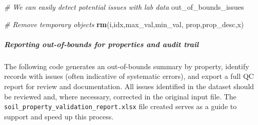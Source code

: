\documentclass[
  10pt,
  b5paper,
  oneside]{book}
\newenvironment{Shaded}{\begin{snugshade}}{\end{snugshade}}
\newcommand{\CommentTok}[1]{\textcolor[rgb]{0.56,0.35,0.01}{\textit{#1}}}
\newcommand{\FunctionTok}[1]{\textcolor[rgb]{0.13,0.29,0.53}{\textbf{#1}}}
\newcommand{\NormalTok}[1]{#1}
\begin{document}
\begin{Shaded}
\begin{Highlighting}[]
\CommentTok{\# We can easily detect potential issues with lab data}
\NormalTok{out\_of\_bounds\_issues}

\CommentTok{\# Remove temporary objects}
\FunctionTok{rm}\NormalTok{(i,idx,max\_val,min\_val, prop,prop\_desc,x)}
\end{Highlighting}
\end{Shaded}

\subparagraph*{Reporting out-of-bounds for properties and audit trail}\label{reporting-out-of-bounds-for-properties-and-audit-trail}

The following code generates an out-of-bounds summary by property, identify records with issues (often indicative of systematic errors), and export a full QC report for review and documentation. All issues identified in the dataset should be reviewed and, where necessary, corrected in the original input file. The \texttt{soil\_property\_validation\_report.xlsx} file created serves as a guide to support and speed up this process.
\end{document}
